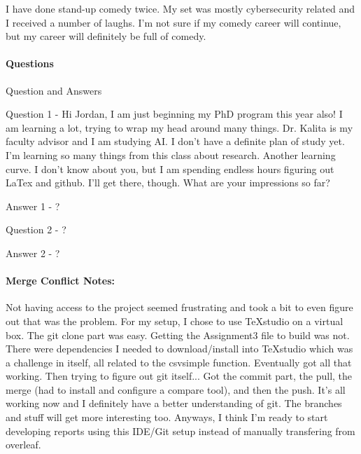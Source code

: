 	I have done stand-up comedy twice. My set was mostly cybersecurity related and I received a number of laughs. I'm not sure if my comedy career will continue, but my career will definitely be full of comedy. 
	

	
	
	
	\paragraph*{\textbf{Questions}}
	
	Question and Answers
	
	
	Question 1 - Hi Jordan, I am just beginning my PhD program this year also!  I am learning a lot, trying to wrap my head around many things.  Dr. Kalita is my faculty advisor and I am studying AI.  I don't have a definite plan of study yet.  I'm learning so many things from this class about research. Another learning curve.  I don't know about you, but I am spending endless hours figuring out LaTex and github. I'll get there, though.  What are your impressions so far?
	
	
	Answer 1 - ?

	
	Question 2 - ?
	
	
	Answer 2 - ?


	\paragraph*{\textbf{Merge Conflict Notes:}}
	
	
	Not having access to the project seemed frustrating and took a bit to even figure out that was the problem. For my setup, I chose to use TeXstudio on a virtual box. The git clone part was easy. Getting the Assignment3 file to build was not. There were dependencies I needed to download/install into TeXstudio which was a challenge in itself, all related to the csvsimple function. Eventually got all that working. Then trying to figure out git itself... Got the commit part, the pull, the merge (had to install and configure a compare tool), and then the push. It's all working now and I definitely have a better understanding of git. The branches and stuff will get more interesting too. Anyways, I think I'm ready to start developing reports using this IDE/Git setup instead of manually transfering from overleaf.
		
	
%

 

